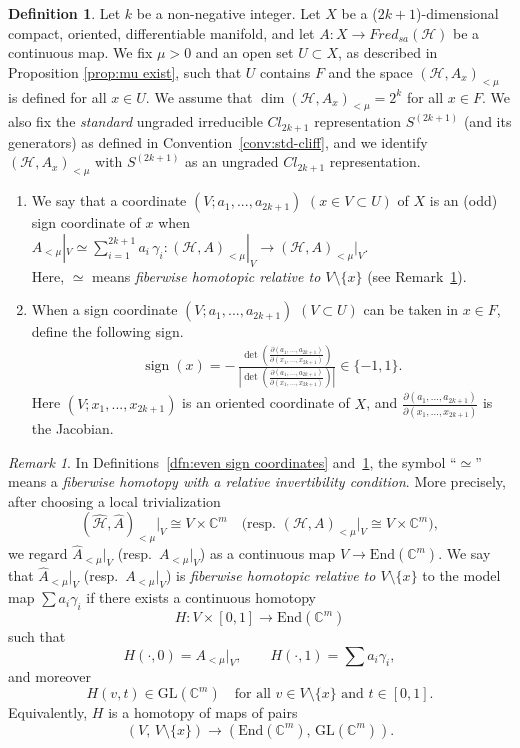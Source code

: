 \documentclass{amsart}
\theoremstyle{definition}
\newtheorem{dfn}[thm]{Definition}
\theoremstyle{remark}
\newtheorem{rem}[thm]{Remark}
\newcommand{\C}{\mathbb{C}}
\begin{document}
\begin{dfn}\label{dfn:odd sign coordinates}
Let $k$ be a non-negative integer. Let $X$ be a ($2k+1$)-dimensional compact, oriented, differentiable manifold, and let $A\colon X\to Fred_{sa}(\mathcal{H})$ be a continuous map. We fix $\mu > 0$ and an open set $U \subset X$, as described in Proposition \ref{prop:mu exist}, such that $U$ contains $F$ and the space $(\mathcal{H}, A_x)_{<\mu}$ is defined for all $x \in U$. We assume that $\dim(\mathcal{H}, A_x)_{<\mu} = 2^k$ for all $x \in F$. We also fix the \emph{standard} ungraded irreducible $Cl_{2k+1}$ representation $S^{(2k+1)}$ (and its generators) as defined in Convention~\ref{conv:std-cliff}, and we identify $(\mathcal{H}, A_x)_{<\mu}$ with $S^{(2k+1)}$ as an ungraded $Cl_{2k+1}$ representation.
\begin{enumerate}
\item We say that a coordinate $(V;a_1,...,a_{2k+1})$ $(x\in V \subset U)$ of $X$ is an (odd) sign coordinate of $x$ when $A_{<\mu}|_V \simeq \sum_{i=1}^{2k+1} a_i\,\gamma_i:(\mathcal{H},A)_{<\mu}|_V\to (\mathcal{H},A)_{<\mu}|_V.$\\
Here, $\simeq$ means \emph{fiberwise homotopic relative to $V\setminus\{x\}$} (see Remark~\ref{rem:fiberwise-homotopy}).
\item When a sign coordinate $(V;a_{1},...,a_{2k+1})$ $(V\subset U)$ can be taken in $x \in F$, define the following sign.
\begin{align*}
\operatorname{sign}(x)=
-\,
\frac{\det\left(\frac{\partial(a_{1},\dots,a_{2k+1})}{\partial (x_{1},\dots,x_{2k+1})}\right)}
{\left|\det\left(\frac{\partial(a_{1},\dots,a_{2k+1})}{\partial (x_{1},\dots,x_{2k+1})}\right)\right|}
\in \{-1,1\}.
\end{align*}
Here $(V;x_{1},...,x_{2k+1})$ is an oriented coordinate of $X$, and $\frac{\partial(a_{1},...,a_{2k+1})}{\partial (x_{1},...,x_{2k+1})}$ is the Jacobian.
\end{enumerate}
\end{dfn}

\begin{rem}\label{rem:fiberwise-homotopy}
In Definitions~\ref{dfn:even sign coordinates} and~\ref{dfn:odd sign coordinates}, the symbol ``$\simeq$'' means a \emph{fiberwise homotopy with a relative invertibility condition}.
More precisely, after choosing a local trivialization
\[
(\mathcal{\hat{H}}, \hat{A})_{<\mu}\big|_V \cong V \times \C^{m}
\quad\text{(resp.\ }(\mathcal{H}, A)_{<\mu}\big|_V \cong V \times \C^{m}\text{)},
\]
we regard $\hat{A}_{<\mu}\big|_V$ (resp.\ $A_{<\mu}\big|_V$) as a continuous map $V \to \mathrm{End}(\C^{m})$.
We say that $\hat{A}_{<\mu}\big|_V$ (resp.\ $A_{<\mu}\big|_V$) is \emph{fiberwise homotopic relative to $V\setminus\{x\}$}
to the model map $\sum a_i \gamma_i$ if there exists a continuous homotopy
\[
H: V \times [0,1] \longrightarrow \mathrm{End}(\C^{m})
\]
such that
\[
H(\cdot,0)=A_{<\mu}\big|_V,\qquad
H(\cdot,1)=\sum a_i \gamma_i,
\]
and moreover
\[
H(v,t)\in \mathrm{GL}(\C^{m})\quad \text{for all } v\in V\setminus\{x\}\text{ and } t\in[0,1].
\]
Equivalently, $H$ is a homotopy of maps of pairs
\[
(V,\,V\setminus\{x\}) \to (\mathrm{End}(\C^{m}),\,\mathrm{GL}(\C^{m})).
\]
\end{rem}
\end{document}
